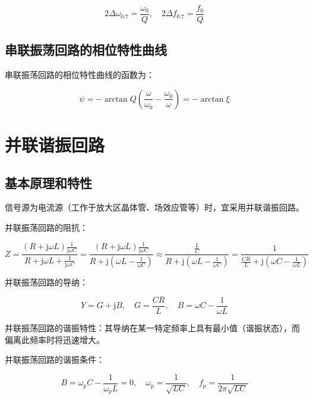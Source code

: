 \begin{equation}
    2\Delta \omega_{0.7} = \frac{\omega_0}{Q}, \quad 2\Delta f_{0.7} = \frac{f_0}{Q}
\end{equation}

\subsection{串联振荡回路的相位特性曲线}

串联振荡回路的相位特性曲线的函数为：

\begin{equation}
    \psi = -\arctan{Q \left( \frac{\omega}{\omega_0} - \frac{\omega_0}{\omega} \right) } = -\arctan{\xi}
\end{equation}

\section{并联谐振回路}

\subsection{基本原理和特性}

信号源为电流源（工作于放大区晶体管、场效应管等）时，宜采用并联谐振回路。

并联振荡回路的阻抗：

\begin{equation}
    Z = \frac{ \left( R + \text{j} \omega L \right) \frac{1}{\text{j} \omega C} }{ R + \text{j} \omega L + \frac{1}{\text{j} \omega C}}
    = \frac{ \left( R + \text{j} \omega L \right) \frac{1}{\text{j} \omega C} }{ R + \text{j} \left( \omega L - \frac{1}{ \omega C } \right) }
    \approx \frac{\frac{L}{C}}{ R + \text{j} \left( \omega L - \frac{1}{ \omega C } \right) }
    = \frac{1}{ \frac{CR}{L} + \text{j} \left( \omega C - \frac{1}{ \omega L } \right) }
\end{equation}

并联振荡回路的导纳：

\begin{equation}
    Y = G + \text{j}B, \quad G = \frac{CR}{L}, \quad B = \omega C - \frac{1}{ \omega L }
\end{equation}

并联振荡回路的谐振特性：其导纳在某一特定频率上具有最小值（谐振状态），而偏离此频率时将迅速增大。

并联振荡回路的谐振条件：

\begin{equation}
    B = \omega_p C - \frac{1}{\omega_p L} = 0, \quad \omega_p = \frac{1}{\sqrt{LC}}, \quad f_p = \frac{1}{2\pi \sqrt{LC}}
\end{equation}

